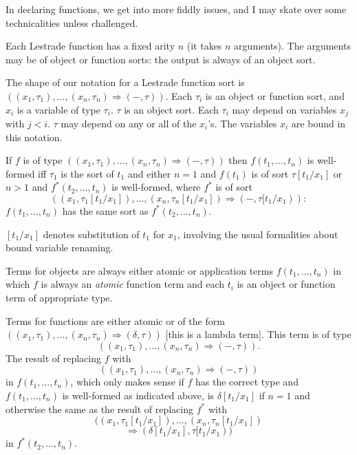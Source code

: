 \documentclass{slides}
\begin{document}
\begin{slide}

In declaring functions, we get into more fiddly issues, and I may skate over some technicalities unless challenged.

Each Lestrade function has a fixed arity $n$ (it takes $n$ arguments).  The arguments may be of object or function sorts:  the output is always of an object sort.

The shape of our notation for a Lestrade function sort is $((x_1,\tau_1),\ldots,(x_n,\tau_n) \Rightarrow (-,\tau))$.  Each $\tau_i$ is an object or function sort, and $x_i$ is a variable of type $\tau_i$.  $\tau$ is an object sort.  Each $\tau_i$ may depend on variables $x_j$ with $j<i$.  $\tau$ may depend on any or all of the $x_i$'s.  The variables $x_i$ are bound in this notation.

\end{slide}

\begin{slide}

If $f$ is of type $((x_1,\tau_1),\ldots,(x_n,\tau_n) \Rightarrow (-,\tau))$ then $f(t_1,\ldots,t_n)$  is well-formed iff $\tau_1$ is the sort of $t_1$
and either $n=1$ and $f(t_1)$ is of sort $\tau[t_1/x_1]$ or $n>1$ and 
$f^*(t_2,\ldots,t_n)$ is well-formed, where $f^*$ is of sort $$((x_1,\tau_1[t_1/x_1]),\ldots,(x_n,\tau_n[t_1/x_1]) \Rightarrow (-,\tau[t_1/x_1)):$$  $f(t_1,\ldots,t_n)$ has the same sort as  $f^*(t_2,\ldots,t_n)$.

$[t_1/x_1]$ denotes substitution of $t_1$ for $x_1$, involving the usual formalities about bound variable renaming.


\end{slide}

\begin{slide}

Terms for objects are always either atomic or application terms $f(t_1,\ldots,t_n)$ in which $f$ is always an {\em atomic} function term and each $t_i$ is an object or function term of appropriate type.

Terms for functions are either atomic or of the form $((x_1,\tau_1),\ldots,(x_n,\tau_n) \Rightarrow (\delta,\tau))$ [this is a lambda term].  This term is of type $$((x_1,\tau_1),\ldots,(x_n,\tau_n) \Rightarrow (-,\tau)).$$  The result of replacing $f$ with $$((x_1,\tau_1),\ldots,(x_n,\tau_n) \Rightarrow (-,\tau))$$ in
$f(t_1,\ldots,t_n)$, which only makes sense if $f$ has the correct type and $f(t_1,\ldots,t_n)$ is well-formed as indicated above, is $\delta[t_1/x_1]$ if
$n=1$ and otherwise the same as the result of replacing $f^*$ with $$((x_1,\tau_1[t_1/x_1]),\ldots,(x_n,\tau_n[t_1/x_1]) $$ $$\Rightarrow (\delta[t_1/x_1],\tau[t_1/x_1))$$ in
$f^*(t_2,\ldots,t_n)$. 

\end{slide}
\end{document}
